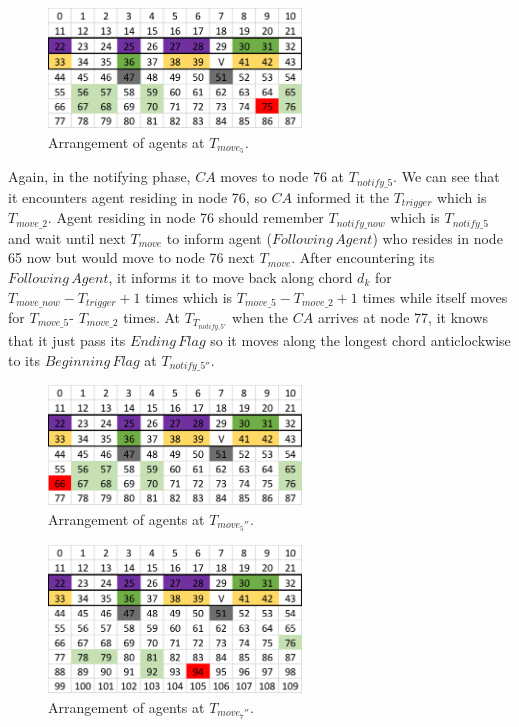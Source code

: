 \begin{figure}[H]
  \centering  
  \includegraphics[width=0.6\textwidth]{figures/T75.png}
  \caption{Arrangement of agents at $T_{move_5}$. }\label{fig:T75}
\end{figure}
Again, in the notifying phase, $CA$ moves to node 76 at $T_{notify\_5}$. We can see that it encounters agent residing in node 76, so $CA$ informed it the $T_{trigger}$ which is $T_{move\_2}$. Agent residing in node 76 should remember $T_{notify\_now}$ which is $T_{notify\_5}$ and wait until next $T_{move}$ to inform agent ($Following\,Agent$) who resides in node 65 now but would move to node 76 next $T_{move}$. After encountering its $Following\,Agent$, it informs it to move back along chord $d_k$ for $T_{move\_now}-T_{trigger} +1$ times which is $T_{move\_5}- T_{move\_2}+1$ times while itself moves for $T_{move\_5}$- $T_{move\_2}$ times. 
At $T_{T_{notify\_5'}}$ when the $CA$ arrives at node 77, it knows that it just pass its $Ending\,Flag$ so it moves along the longest chord anticlockwise to its $Beginning\,Flag$ at $T_{notify\_5''}$.
\begin{figure}[H]
  \centering  
  \includegraphics[width=0.6\textwidth]{figures/T66.png}
  \caption{Arrangement of agents at $T_{move_5''}$. }\label{fig:T66}
\end{figure}

\begin{figure}[H]
  \centering  
  \includegraphics[width=0.6\textwidth]{figures/T94.png}
  \caption{Arrangement of agents at $T_{move_7''}$. }\label{fig:T94}
\end{figure}

